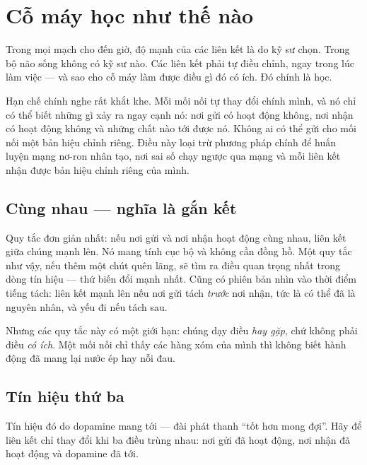 \chapter{Cỗ máy học như thế nào}

Trong mọi mạch cho đến giờ, độ mạnh của các liên kết là do kỹ sư chọn. Trong bộ não sống không có kỹ sư nào. Các liên kết phải tự điều chỉnh, ngay trong lúc làm việc --- và sao cho cỗ máy làm được điều gì đó có ích. Đó chính là học.

Hạn chế chính nghe rất khắt khe. Mỗi mối nối tự thay đổi chính mình, và nó chỉ có thể biết những gì xảy ra ngay cạnh nó: nơi gửi có hoạt động không, nơi nhận có hoạt động không và những chất nào tới được nó. Không ai có thể gửi cho mối nối một bản hiệu chỉnh riêng. Điều này loại trừ phương pháp chính để huấn luyện mạng nơ-ron nhân tạo, nơi sai số chạy ngược qua mạng và mỗi liên kết nhận được bản hiệu chỉnh riêng của mình.

\section*{Cùng nhau --- nghĩa là gắn kết}

Quy tắc đơn giản nhất: nếu nơi gửi và nơi nhận hoạt động cùng nhau, liên kết giữa chúng mạnh lên. Nó mang tính cục bộ và không cần đồng hồ. Một quy tắc như vậy, nếu thêm một chút quên lãng, sẽ tìm ra điều quan trọng nhất trong dòng tín hiệu --- thứ biến đổi mạnh nhất. Cũng có phiên bản nhìn vào thời điểm tiếng tách: liên kết mạnh lên nếu nơi gửi tách \emph{trước} nơi nhận, tức là có thể đã là nguyên nhân, và yếu đi nếu tách sau.

Nhưng các quy tắc này có một giới hạn: chúng dạy điều \emph{hay gặp}, chứ không phải điều \emph{có ích}. Một mối nối chỉ thấy các hàng xóm của mình thì không biết hành động đã mang lại nước ép hay nỗi đau.

\section*{Tín hiệu thứ ba}

Tín hiệu đó do dopamine mang tới --- đài phát thanh ``tốt hơn mong đợi''. Hãy để liên kết chỉ thay đổi khi ba điều trùng nhau: nơi gửi đã hoạt động, nơi nhận đã hoạt động và dopamine đã tới.


